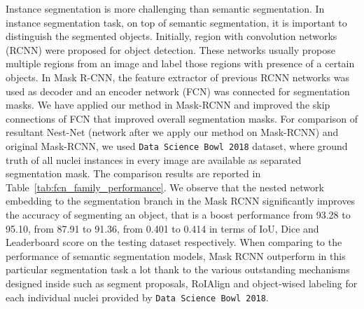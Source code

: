 \documentclass[runningheads]{llncs}
\begin{document}
Instance segmentation is more challenging than semantic segmentation. In instance segmentation task, on top of semantic segmentation, it is important to distinguish the segmented objects. Initially, region with convolution networks (RCNN) were proposed for object detection. These networks usually propose multiple regions from an image and label those regions with presence of a certain objects. In Mask R-CNN, the feature extractor of previous RCNN networks was used as decoder and an encoder network (FCN) was connected for segmentation masks. We have applied our method in Mask-RCNN and improved the skip connections of FCN that improved overall segmentation masks. For comparison of resultant Nest-Net (network after we apply our method on Mask-RCNN) and original Mask-RCNN, we used \texttt{Data Science Bowl 2018} dataset, where ground truth of all nuclei instances in every image are available as separated segmentation mask. The comparison results are reported in Table~\ref{tab:fcn_family_performance}. We observe that the nested network embedding to the segmentation branch in the Mask RCNN significantly improves the accuracy of segmenting an object, that is a boost performance from 93.28 to 95.10, from 87.91 to 91.36, from 0.401 to 0.414 in terms of IoU, Dice and Leaderboard score on the testing dataset respectively. When comparing to the performance of semantic segmentation models, Mask RCNN outperform in this particular segmentation task a lot thank to the various outstanding mechanisms designed inside such as segment proposals, RoIAlign and object-wised labeling for each individual nuclei provided by \texttt{Data Science Bowl 2018}.
\end{document}
